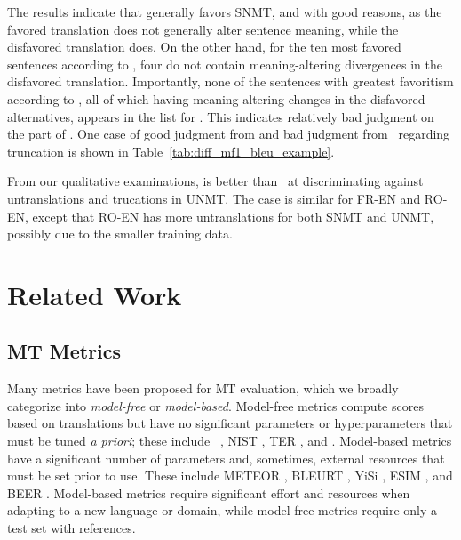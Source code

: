 The results indicate that  generally favors SNMT, and with good reasons, as the favored translation does not generally alter sentence meaning, while the disfavored translation does. On the other hand, for the ten most favored sentences according to \bleu, four do not contain meaning-altering divergences in the disfavored translation. Importantly, none of the sentences with greatest favoritism according to , all of which having meaning altering changes in the disfavored alternatives, appears in the list for \bleu. This indicates relatively bad judgment on the part of \bleu. One case of good judgment from  and bad judgment from \bleu\ regarding truncation is shown in Table~\ref{tab:diff_mf1_bleu_example}. 

From our qualitative examinations,  is better than \bleu\ at discriminating against untranslations and trucations in UNMT. The case is similar for FR-EN and RO-EN, except that RO-EN has more untranslations for both SNMT and UNMT, possibly due to the smaller training data. 





\section{Related Work}

\subsection{MT Metrics}
 Many metrics have been proposed for MT evaluation, which we broadly categorize into \textit{model-free} or \textit{model-based}. Model-free metrics compute scores based on translations but have no significant parameters or hyperparameters that must be tuned \textit{a priori}; these include  \bleu\ \cite{papineni-etal-2002-bleu}, NIST \cite{doddington2002-nist}, TER \cite{snover2006TER}, and  \cite{popovic-2015-chrf}.  Model-based metrics have a significant number of parameters and, sometimes, external resources that must be set prior to use. These include METEOR \cite{banerjee-lavie-2005-meteor},  BLEURT \cite{sellam-etal-2020-bleurt}, YiSi \cite{lo-2019-yisi}, ESIM \cite{mathur-etal-2019-ESIM}, and BEER \cite{stanojevic-simaan-2014-beer}. Model-based metrics require significant effort and resources when adapting to a new language or domain, while model-free metrics require only a test set with references. 

